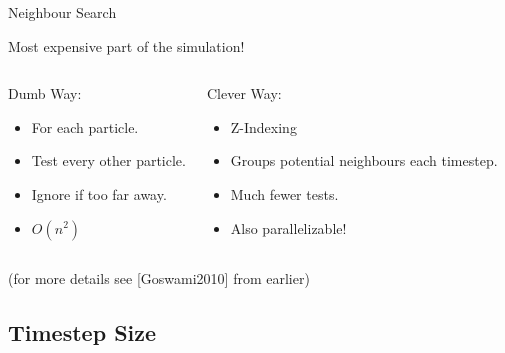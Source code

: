 \documentclass[12pt]{beamer}
\begin{document}
\begin{frame}[t]{Neighbour Search}
\pause 

\color{white}
Most expensive part of the simulation!

\begin{columns}[t]

\begin{block}{Dumb Way:}

\begin{itemize}[<+->]
\item For each particle.
\item Test every other particle.
\item Ignore if too far away.
\item $O(n^2)$
\end{itemize}

\end{block}

\pause
{}

\begin{block}{Clever Way:}

\begin{itemize}[<+->]
\item Z-Indexing 
\item Groups potential neighbours each timestep.
\item Much fewer tests.
\item \color{green} Also parallelizable!
\end{itemize}

\end{block}

\end{columns}

\pause
\tiny{\color{white} (for more details see [Goswami2010] from earlier) }

\end{frame}


\subsection{Timestep Size}
\end{document}
